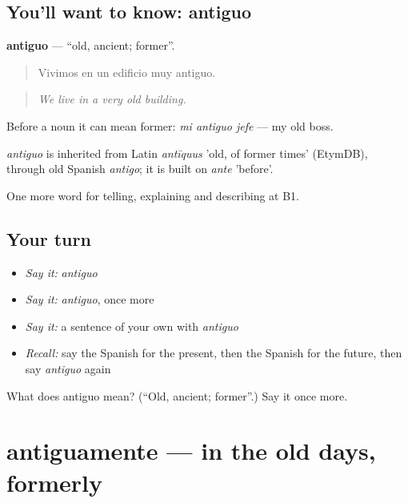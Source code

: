 \subsection*{You'll want to know: antiguo}
\textbf{antiguo} — \textquotedblleft{}old, ancient; former\textquotedblright{}.

\begin{quote}
Vivimos en un edificio muy antiguo.
\end{quote}

\begin{quote}
\emph{We live in a very old building.}
\end{quote}

Before a noun it can mean former: \emph{mi antiguo jefe} — my old boss.

\begin{cousinweb}
\emph{antiguo} is inherited from Latin \emph{antīquus} 'old, of former times' (EtymDB), through old Spanish \emph{antigo}; it is built on \emph{ante} 'before'.
\end{cousinweb}

\begin{grammarlens}[title={What you've built}]
One more word for telling, explaining and describing at B1.
\end{grammarlens}

\subsection*{Your turn}
\begin{itemize}
\raggedright
  \item \emph{Say it:} \emph{antiguo}
  \item \emph{Say it:} \emph{antiguo}, once more
  \item \emph{Say it:} a sentence of your own with \emph{antiguo}
  \item \emph{Recall:} say the Spanish for the present, then the Spanish for the future, then say \emph{antiguo} again
\end{itemize}

\begin{tcolorbox}[breakable,colback=teal!4,colframe=teal!35!black,title={Before you move on}]
What does antiguo mean? (\textquotedblleft{}Old, ancient; former\textquotedblright{}.) Say it once more.
\end{tcolorbox}
\section[antiguamente]{antiguamente — in the old days, formerly}


